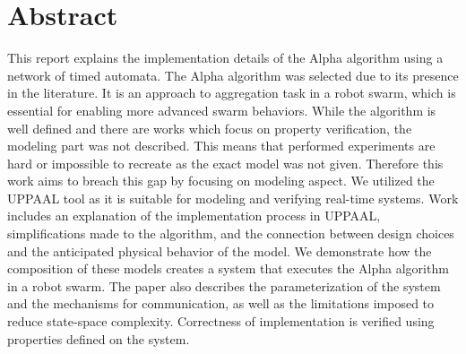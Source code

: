 \section{Abstract}
This report explains the implementation details of the Alpha algorithm using a network of timed automata. The Alpha algorithm was selected due to its presence in the literature. It is an approach to aggregation task in a robot swarm, which is essential for enabling more advanced swarm behaviors. While the algorithm is well defined and there are works which focus on property verification, the modeling part was not described. This means that performed experiments are hard or impossible to recreate as the exact model was not given. Therefore this work aims to breach this gap by focusing on modeling aspect. We utilized the UPPAAL tool as it is suitable for modeling and verifying real-time systems. Work includes an explanation of the implementation process in UPPAAL, simplifications made to the algorithm, and the connection between design choices and the anticipated physical behavior of the model. We demonstrate how the composition of these models creates a system that executes the Alpha algorithm in a robot swarm. The paper also describes the parameterization of the system and the mechanisms for communication, as well as the limitations imposed to reduce state-space complexity. Correctness of implementation is verified using properties defined on the system.